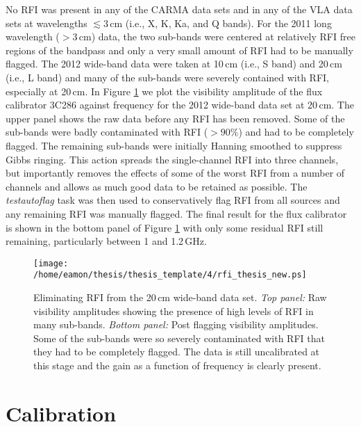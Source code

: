 No RFI was present in any of the CARMA data sets and in any of the VLA data sets at wavelengths $\lesssim 3$\,cm (i.e., X, K, Ka, and Q bands). For the 2011 long wavelength ($> 3$\,cm) data, the two sub-bands were centered at relatively RFI free regions of the bandpass and only a very small amount of RFI had to be manually flagged. The 2012 wide-band data were taken at 10\,cm (i.e., S band) and 20\,cm (i.e., L band) and many of the sub-bands were severely contained with RFI, especially at 20\,cm. In Figure \ref{fig:4.3} we plot the visibility amplitude of the flux calibrator 3C286 against frequency for the 2012 wide-band data set at 20\,cm. The upper panel shows the raw data before any RFI has been removed. Some of the sub-bands were badly contaminated with RFI ($>90\%$) and had to be completely flagged. The remaining sub-bands were initially Hanning smoothed to suppress Gibbs ringing. This action spreads the single-channel RFI into three channels, but importantly removes the effects of some of the worst RFI from a number of channels and allows as much good data to be retained as possible. The \textit{testautoflag} task was then used to conservatively flag RFI from all sources and any remaining RFI was manually flagged. The final result for the flux calibrator is shown in the bottom panel of Figure \ref{fig:4.3} with only some residual RFI still remaining, particularly between 1 and 1.2\,GHz.

\begin{figure}[hbt!]
\centering 
\texttt{[image: /home/eamon/thesis/thesis\_template/4/rfi\_thesis\_new.ps]}  
\caption[Eliminating RFI from the L band data set.]{Eliminating RFI from the 20\,cm wide-band data set. \textit{Top panel:} Raw visibility amplitudes showing the presence of high levels of RFI in many sub-bands. \textit{Bottom panel:} Post flagging visibility amplitudes. Some of the sub-bands were so severely contaminated with RFI that they had to be completely flagged. The data is still uncalibrated at this stage and the gain as a function of frequency is clearly present.}
\label{fig:4.3}
\end{figure}

\section{Calibration}\label{sec:4.2}

